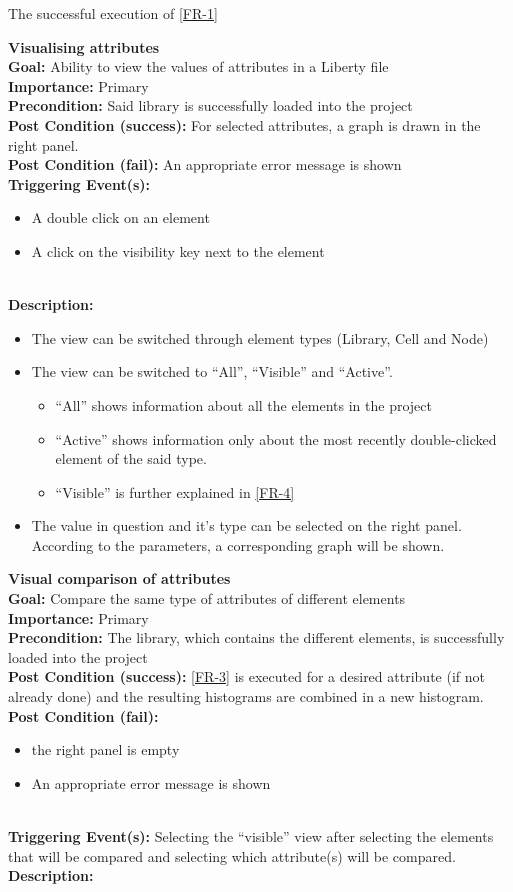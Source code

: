 \documentclass[10pt,a4paper]{report}
\newcommand{\FRDescription}[8]{
    \textbf{#1} \leavevmode \\
    \textbf{Goal: } #2 \leavevmode \\
    \textbf{Importance: } #3 \leavevmode \\
    \textbf{Precondition: } #4 \leavevmode \\
    \textbf{Post Condition (success): } #5 \leavevmode \\
    \textbf{Post Condition (fail): } #6 \leavevmode \\
    \textbf{Triggering Event(s): } #7 \leavevmode \\
    \textbf{Description: } \leavevmode \\ 
    #8}
\begin{document}
\begin{FR}
{\begin{itemize}
    \end{itemize}}
    {The successful execution of \ref{FR-1}}
    \item \FRDescription{Visualising attributes}
    {Ability to view the values of attributes in a Liberty file}
    {Primary}
    {Said library is successfully loaded into the project}
    {For selected attributes, a graph is drawn in the right panel.}
    {An appropriate error message is shown}
    {\begin{itemize}
        \item A double click on an element
        \item A click on the visibility key next to the element
    \end{itemize}}
    {\begin{itemize}
        \item The view can be switched through element types (Library, Cell and Node)
        \item The view can be switched to “All”, “Visible” and “Active”.
        \begin{itemize}
            \item “All” shows information about all the elements in the project
            \item “Active” shows information only about the most recently double-clicked element of the said type.
            \item “Visible” is further explained in \ref{FR-4}
        \end{itemize}
        \item The value in question and it’s type can be selected on the right panel. According to the parameters, a corresponding graph will be shown.
    \end{itemize}}
    \item \FRDescription{Visual comparison of attributes}
    {Compare the same type of attributes of different elements}
    {Primary}
    {The library, which contains the different elements,  is successfully loaded into the project}
    {\ref{FR-3} is executed for a desired attribute (if not already done) and the resulting histograms are combined in a new histogram.}
    {
    \begin{itemize}
        \item the right panel is empty
        \item An appropriate error message is shown
    \end{itemize}
    }
    {Selecting the “visible” view after selecting the elements that will be compared and selecting which attribute(s) will be compared.}

\end{FR}
\end{document}
